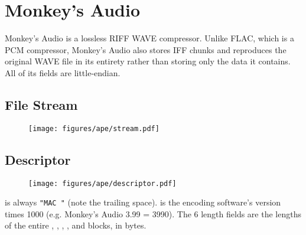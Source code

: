 
\chapter{Monkey's Audio}
Monkey's Audio is a lossless RIFF WAVE compressor.
Unlike FLAC, which is a PCM compressor, Monkey's Audio also stores
IFF chunks and reproduces the original WAVE file in its entirety rather
than storing only the data it contains.
All of its fields are little-endian.

\section{File Stream}
\begin{figure}[h]
\texttt{[image: figures/ape/stream.pdf]}
\end{figure}

\clearpage

\section{Descriptor}
\begin{figure}[h]
\texttt{[image: figures/ape/descriptor.pdf]}
\end{figure}
\par
\noindent
{} is always \texttt{"MAC "} (note the trailing space).
 is the encoding software's version times 1000
(e.g. Monkey's Audio 3.99 = 3990).
The 6 length fields are the lengths of the entire
, , ,
,  and  blocks,
in bytes.

